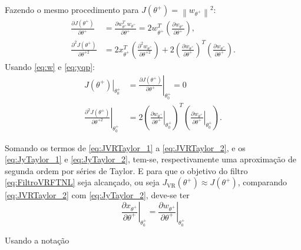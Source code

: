 Fazendo o mesmo procedimento para $J\left(\theta^{+}\right)=\left\|w_{\theta^{+}}\right\|^{2}$:
\begin{align}
\frac{\partial J\left(\theta^{+}\right)}{\partial \theta^{+}} 
   &=\frac{\partial w_{\theta^{+}}^{T} w_{\theta^{+}}}{\partial \theta^{+}}=2 w_{\theta^{+}}^{T}\left(\frac{\partial w_{\theta^{+}}}{\partial \theta^{+}}\right), \\
\frac{\partial^{2} J\left(\theta^{+}\right)}{\partial \theta^{+2}}&= 2 x_{\theta^{+}}^{T}\left(\frac{\partial^{2} w_{\theta^{+}}}{\partial \theta^{+2}}\right) 
+2\left(\frac{\partial w_{\theta^{+}}}{\partial \theta^{+}}\right)^{T}\left(\frac{\partial w_{\theta^{+}}}{\partial \theta^{+}}\right).
\label{eq:}
\end{align}
Usando \eqref{eq:w} e \eqref{eq:yqp}:
\begin{align}
\left.J\left(\theta^{+}\right)\right|_{\theta_{0}^{+}}                                                                      
&=\left.\frac{\partial J\left(\theta^{+}\right)}{\partial \theta^{+}}\right|_{\theta_{0}^{+}}=0 \label{eq:JyTaylor_1} \\
   \left.\frac{\partial^{2} J\left(\theta^{+}\right)}{\partial \theta^{+2}}\right|_{\theta_{0}^{+}} &= 2\left(\left.\frac{\partial w_{\theta^{+}}}{\partial \theta^{+}}\right|_{\theta_{0}^{+}}\right)^{T}\left(\left.\frac{\partial w_{\theta^{+}}}{\partial \theta^{+}}\right|_{\theta_{0}^{+}}\right) . \label{eq:JyTaylor_2}
\end{align}

Somando os termos de \eqref{eq:JVRTaylor_1} a \eqref{eq:JVRTaylor_2}, e os \eqref{eq:JyTaylor_1} e \eqref{eq:JyTaylor_2}, tem-se, respectivamente uma aproximação de segunda ordem por séries de Taylor. E para que o objetivo do filtro \eqref{eq:FiltroVRFTNL} seja alcançado, ou seja $ J_{\mathrm{VR}}\left(\theta^{+}\right) \approx J\left(\theta^{+}\right)$, comparando \eqref{eq:JVRTaylor_2} com \eqref{eq:JyTaylor_2}, deve-se ter  
\begin{equation}
   \left.\frac{\partial x_{\theta^{+}}}{\partial \theta^{+}}\right|_{\theta_{0}^{+}}=\left.\frac{\partial w_{\theta^{+}}}{\partial \theta^{+}}\right|_{\theta_{0}^{+}}
   \label{eq:FilterObjective}
\end{equation}

Usando a notação 

